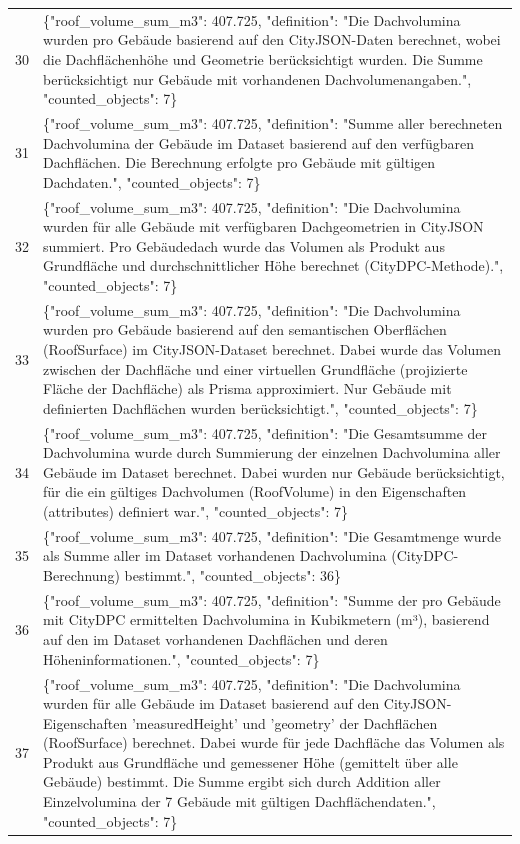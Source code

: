 \documentclass[a4paper,11pt]{article}
\begin{document}
\begin{table}[ht]
\begin{tabular}{r p{12cm}}
30 & \{"roof\_volume\_sum\_m3": 407.725, "definition": "Die Dachvolumina wurden pro Gebäude basierend auf den CityJSON-Daten berechnet, wobei die Dachflächenhöhe und Geometrie berücksichtigt wurden. Die Summe berücksichtigt nur Gebäude mit vorhandenen Dachvolumenangaben.", "counted\_objects": 7\} \\
31 & \{"roof\_volume\_sum\_m3": 407.725, "definition": "Summe aller berechneten Dachvolumina der Gebäude im Dataset basierend auf den verfügbaren Dachflächen. Die Berechnung erfolgte pro Gebäude mit gültigen Dachdaten.", "counted\_objects": 7\} \\
32 & \{"roof\_volume\_sum\_m3": 407.725, "definition": "Die Dachvolumina wurden für alle Gebäude mit verfügbaren Dachgeometrien in CityJSON summiert. Pro Gebäudedach wurde das Volumen als Produkt aus Grundfläche und durchschnittlicher Höhe berechnet (CityDPC-Methode).", "counted\_objects": 7\} \\
33 & \{"roof\_volume\_sum\_m3": 407.725, "definition": "Die Dachvolumina wurden pro Gebäude basierend auf den semantischen Oberflächen (RoofSurface) im CityJSON-Dataset berechnet. Dabei wurde das Volumen zwischen der Dachfläche und einer virtuellen Grundfläche (projizierte Fläche der Dachfläche) als Prisma approximiert. Nur Gebäude mit definierten Dachflächen wurden berücksichtigt.", "counted\_objects": 7\} \\
34 & \{"roof\_volume\_sum\_m3": 407.725, "definition": "Die Gesamtsumme der Dachvolumina wurde durch Summierung der einzelnen Dachvolumina aller Gebäude im Dataset berechnet. Dabei wurden nur Gebäude berücksichtigt, für die ein gültiges Dachvolumen (RoofVolume) in den Eigenschaften (attributes) definiert war.", "counted\_objects": 7\} \\
35 & \{"roof\_volume\_sum\_m3": 407.725, "definition": "Die Gesamtmenge wurde als Summe aller im Dataset vorhandenen Dachvolumina (CityDPC-Berechnung) bestimmt.", "counted\_objects": 36\} \\
36 & \{"roof\_volume\_sum\_m3": 407.725, "definition": "Summe der pro Gebäude mit CityDPC ermittelten Dachvolumina in Kubikmetern (m³), basierend auf den im Dataset vorhandenen Dachflächen und deren Höheninformationen.", "counted\_objects": 7\} \\
37 & \{"roof\_volume\_sum\_m3": 407.725, "definition": "Die Dachvolumina wurden für alle Gebäude im Dataset basierend auf den CityJSON-Eigenschaften 'measuredHeight' und 'geometry' der Dachflächen (RoofSurface) berechnet. Dabei wurde für jede Dachfläche das Volumen als Produkt aus Grundfläche und gemessener Höhe (gemittelt über alle Gebäude) bestimmt. Die Summe ergibt sich durch Addition aller Einzelvolumina der 7 Gebäude mit gültigen Dachflächendaten.", "counted\_objects": 7\} \\

\end{tabular}
\end{table}
\end{document}
